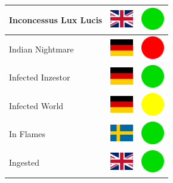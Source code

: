 \documentclass[12pt, a4paper, twoside]{report}
\begin{document}
\begin{center}
\begin{longtable}{|p{5cm}|p{2cm}|p{2cm}|}
Inconcessus Lux Lucis & \includegraphics[width=1cm]{4x3/gb} & \includegraphics[width=1cm]{likes/y} \\ \hline
Indian Nightmare & \includegraphics[width=1cm]{4x3/de} & \includegraphics[width=1cm]{likes/n} \\ \hline
Infected Inzestor & \includegraphics[width=1cm]{4x3/de} & \includegraphics[width=1cm]{likes/y} \\ \hline
Infected World & \includegraphics[width=1cm]{4x3/de} & \includegraphics[width=1cm]{likes/m} \\ \hline
In Flames & \includegraphics[width=1cm]{4x3/se} & \includegraphics[width=1cm]{likes/y} \\ \hline
Ingested & \includegraphics[width=1cm]{4x3/gb} & \includegraphics[width=1cm]{likes/y} \\ \hline

\end{longtable}
\end{center}
\end{document}
